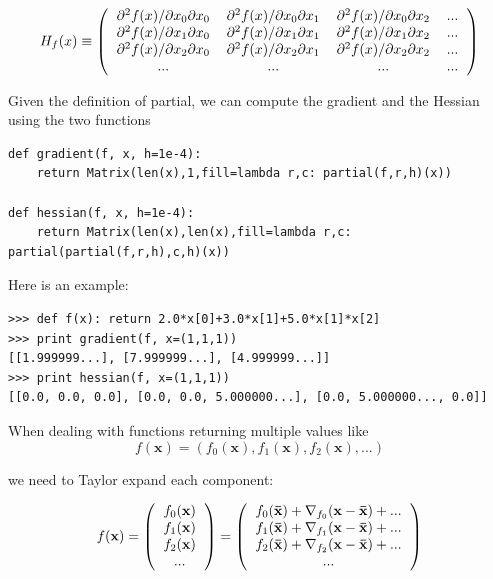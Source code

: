 \documentclass[justified,sixbynine]{tufte-book}
\def\ft{\small\tt}
\theoremstyle{plain}%
\theoremstyle{definition}
\theoremstyle{remark}
\begin{document}
\begin{fullwidth}
\begin{equation}
H_f(x) \equiv \left(
\begin{tabular}{cccc}
$\partial^2 f(x)/\partial x_0\partial x_0$ &
$\partial^2 f(x)/\partial x_0\partial x_1$ &
$\partial^2 f(x)/\partial x_0\partial x_2$ &
... \\
$\partial^2 f(x)/\partial x_1\partial x_0$ &
$\partial^2 f(x)/\partial x_1\partial x_1$ &
$\partial^2 f(x)/\partial x_1\partial x_2$ &
... \\
$\partial^2 f(x)/\partial x_2\partial x_0$ &
$\partial^2 f(x)/\partial x_2\partial x_1$ &
$\partial^2 f(x)/\partial x_2\partial x_2$ &
... \\
... & ... & ... & ...
\end{tabular}
\right)
\end{equation}

Given the definition of partial, we can compute the gradient and the Hessian using the two functions

\begin{lstlisting}[caption={in file: {\ft nlib.py}}]
def gradient(f, x, h=1e-4):
    return Matrix(len(x),1,fill=lambda r,c: partial(f,r,h)(x))

def hessian(f, x, h=1e-4):
    return Matrix(len(x),len(x),fill=lambda r,c: partial(partial(f,r,h),c,h)(x))
\end{lstlisting}

Here is an example:

\begin{lstlisting}[caption={in file: {\ft nlib.py}}]
>>> def f(x): return 2.0*x[0]+3.0*x[1]+5.0*x[1]*x[2]
>>> print gradient(f, x=(1,1,1))
[[1.999999...], [7.999999...], [4.999999...]]
>>> print hessian(f, x=(1,1,1))
[[0.0, 0.0, 0.0], [0.0, 0.0, 5.000000...], [0.0, 5.000000..., 0.0]]
\end{lstlisting}

When dealing with functions returning multiple values like
\begin{equation}
f(\mathbf{x}) = (f_0(\mathbf{x}), f_1(\mathbf{x}), f_2(\mathbf{x}), ...)
\end{equation}

we need to Taylor expand each component:

\begin{equation}
f(\mathbf{x}) =
\left(
\begin{tabular}{c}
$f_0(\mathbf{x})$ \\
$f_1(\mathbf{x})$ \\
$f_2(\mathbf{x})$ \\
...
\end{tabular}
\right) =
\left(
\begin{tabular}{c}
$f_0(\mathbf{\bar x}) + \nabla_{f_0}(\mathbf{x}-\mathbf{\bar x}) + ...$ \\
$f_1(\mathbf{\bar x}) + \nabla_{f_1}(\mathbf{x}-\mathbf{\bar x}) + ...$ \\
$f_2(\mathbf{\bar x}) + \nabla_{f_2}(\mathbf{x}-\mathbf{\bar x}) + ...$ \\
...
\end{tabular}
\right)
\end{equation}


\end{fullwidth}
\end{document}
